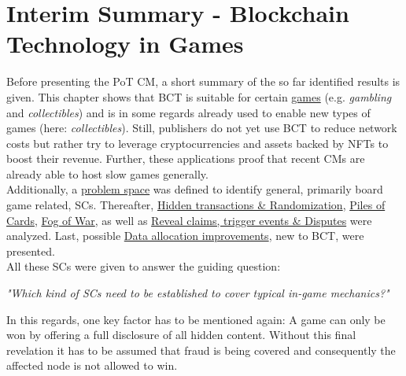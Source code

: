 \section{Interim Summary - Blockchain Technology in Games}
\label{sec:InterimSummary-BCTinG}
Before presenting the \gls{PoT} \gls{CM}, a short summary of the so far identified results is given.
This chapter shows that \gls{BCT} is suitable for certain \hyperref[sec:GamingMarket]{games}
(e.g. \textit{gambling} and \textit{collectibles}) and is in some regards
already used to enable new types of games (here: \textit{collectibles}).
Still, publishers do not yet use \gls{BCT} to reduce network costs but rather
try to leverage cryptocurrencies and assets backed by \gls{NFTs} to boost their revenue.
Further, these applications proof that recent \gls{CM}s are already able to host slow games generally. \\
Additionally, a \hyperref[sec:ProblemSpace]{problem space} was defined to identify general, primarily board game related, \gls{SC}s.
Thereafter, \hyperref[sec:HiddenTransactionsPlusRandomization]{Hidden transactions \& Randomization},
\hyperref[sec:PileOfCards]{Piles of Cards}, \hyperref[sec:FogOfWar]{Fog of War}, as well as 
\hyperref[sec:RcTeDisputes]{Reveal claims, trigger events \& Disputes} were analyzed.
Last, possible \hyperref[sec:DataAllocationImprovements]{Data allocation improvements},
new to \gls{BCT}, were presented. \\
All these \gls{SC}s were given to answer the guiding question:
\begin{center}
	\textit{"Which kind of \gls{SC}s need to be established to cover typical in-game mechanics?"}
\end{center}
In this regards, one key factor has to be mentioned again:
A game can only be won by offering a full disclosure of all hidden content.
Without this final revelation it has to be assumed that fraud is being covered and
consequently the affected node is not allowed to win. \\

